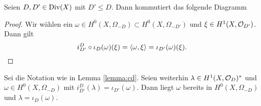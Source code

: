 \begin{lemma}
  \label{lemma:cd}
  Seien $D, D' \in \operatorname{Div}(X)$ mit $D' \leq D$. Dann kommutiert das
  folgende Diagramm
  \begin{center}
  \end{center}
\end{lemma}

\begin{proof}
  Wir wählen ein $\omega \in H^0(X, \Omega_{-D}) \subset H^0(X,
  \Omega_{-D'})$ und $\xi \in H^1(X, \mathcal{O}_{D'})$. Dann gilt
  \[
  i_{D'}^D \circ \iota_D(\omega)(\xi) = \langle \omega, \xi \rangle =
  \iota_{D'}(\omega)(\xi).
  \]
\end{proof}

\begin{lemma}
  \label{lemma:urbilder}
  Sei die Notation wie in Lemma \ref{lemma:cd}. Seien weiterhin
  $\lambda \in H^1(X, \mathcal{O}_D)^\ast$ und $\omega \in H^0(X,
  \Omega_{-D})$ mit $i_{D'}^D(\lambda) = \iota_{D'}(\omega)$. Dann
  liegt $\omega$ bereits in $H^0(X, \Omega_{-D})$ und $\lambda =
  \iota_D (\omega)$.
\end{lemma}

